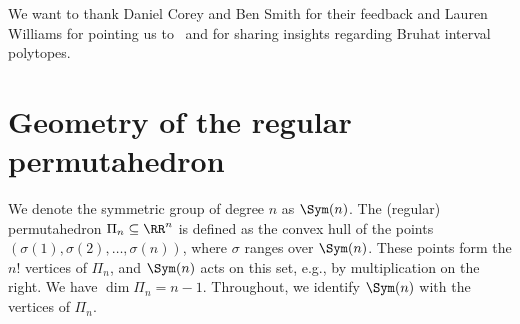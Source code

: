 \acknowledgements
We want to thank Daniel Corey and Ben Smith for their feedback and Lauren Williams for pointing us to~\cite{Boretsky:2021} and for sharing insights regarding Bruhat interval polytopes.










\section{Geometry of the regular permutahedron}
\label{sec:geometry-regular-permutahedron}

We denote the symmetric group of degree $n$ as $\Sym(n)$.
The (regular) permutahedron $\Pi_n\subseteq \RR^n$ is defined as the convex hull of the points $(\sigma(1),\sigma(2),\dots,\sigma(n))$, where $\sigma$ ranges over $\Sym(n)$. 
These points form the $n!$ vertices of $\Pi_n$, and $\Sym(n)$ acts on this set, e.g., by multiplication on the right.
We have $\dim\Pi_n=n-1$.
Throughout, we identify $\Sym(n)$ with the vertices of $\Pi_n$. 

